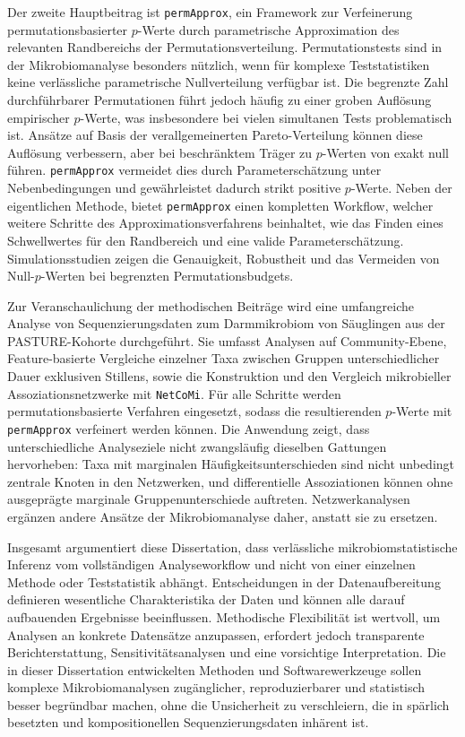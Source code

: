 Der zweite Hauptbeitrag ist \texttt{permApprox}, ein Framework zur Verfeinerung permutationsbasierter $p$-Werte durch parametrische Approximation des relevanten Randbereichs der Permutationsverteilung. Permutationstests sind in der Mikrobiomanalyse besonders nützlich, wenn für komplexe Teststatistiken keine verlässliche parametrische Nullverteilung verfügbar ist. Die begrenzte Zahl durchführbarer Permutationen führt jedoch häufig zu einer groben Auflösung empirischer $p$-Werte, was insbesondere bei vielen simultanen Tests problematisch ist. Ansätze auf Basis der verallgemeinerten Pareto-Verteilung können diese Auflösung verbessern, aber bei beschränktem Träger zu $p$-Werten von exakt null führen. \texttt{permApprox} vermeidet dies durch Parameterschätzung unter Nebenbedingungen und gewährleistet dadurch strikt positive $p$-Werte. Neben der eigentlichen Methode, bietet \texttt{permApprox} einen kompletten Workflow, welcher weitere Schritte des Approximationsverfahrens beinhaltet, wie das Finden eines Schwellwertes für den Randbereich und eine valide Parameterschätzung. Simulationsstudien zeigen die Genauigkeit, Robustheit und das Vermeiden von Null-$p$-Werten bei begrenzten Permutationsbudgets.

Zur Veranschaulichung der methodischen Beiträge wird eine umfangreiche Analyse von Sequenzierungsdaten zum Darmmikrobiom von Säuglingen aus der PASTURE-Kohorte durchgeführt. Sie umfasst Analysen auf Community-Ebene, Feature-basierte Vergleiche einzelner Taxa zwischen Gruppen unterschiedlicher Dauer exklusiven Stillens, sowie die Konstruktion und den Vergleich mikrobieller Assoziationsnetzwerke mit \texttt{NetCoMi}. Für alle Schritte werden permutationsbasierte Verfahren eingesetzt, sodass die resultierenden $p$-Werte mit \texttt{permApprox} verfeinert werden können. Die Anwendung zeigt, dass unterschiedliche Analyseziele nicht zwangsläufig dieselben Gattungen hervorheben: Taxa mit marginalen Häufigkeitsunterschieden sind nicht unbedingt zentrale Knoten in den Netzwerken, und differentielle Assoziationen können ohne ausgeprägte marginale Gruppenunterschiede auftreten. Netzwerkanalysen ergänzen andere Ansätze der Mikrobiomanalyse daher, anstatt sie zu ersetzen.

Insgesamt argumentiert diese Dissertation, dass verlässliche mikrobiomstatistische Inferenz vom vollständigen Analyseworkflow und nicht von einer einzelnen Methode oder Teststatistik abhängt. Entscheidungen in der Datenaufbereitung definieren wesentliche Charakteristika der Daten und können alle darauf aufbauenden Ergebnisse beeinflussen. Methodische Flexibilität ist wertvoll, um Analysen an konkrete Datensätze anzupassen, erfordert jedoch transparente Berichterstattung, Sensitivitätsanalysen und eine vorsichtige Interpretation. Die in dieser Dissertation entwickelten Methoden und Softwarewerkzeuge sollen komplexe Mikrobiomanalysen zugänglicher, reproduzierbarer und statistisch besser begründbar machen, ohne die Unsicherheit zu verschleiern, die in spärlich besetzten und kompositionellen Sequenzierungsdaten inhärent ist.


